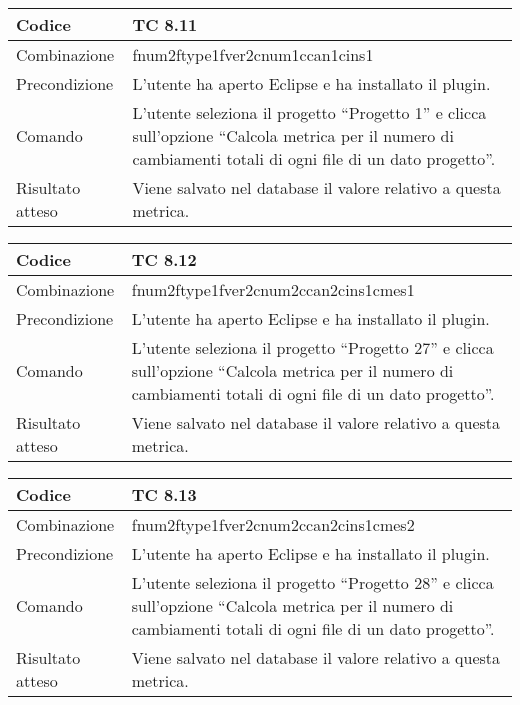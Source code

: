 \begin{table}[ht]
\begin{tabular}{|p{3cm}|p{9cm}|}
\hline
\cellcolor{lightgray}Codice				& TC 8.11								\\
\hline
\cellcolor{lightgray}Combinazione		& fnum2ftype1fver2cnum1ccan1cins1									\\
\hline
\cellcolor{lightgray}Precondizione		& L'utente ha aperto Eclipse e ha installato il plugin.		\\
\hline
\cellcolor{lightgray}Comando			& L'utente seleziona il progetto ``Progetto 1''  e clicca sull'opzione ``Calcola metrica per il numero di cambiamenti totali di ogni file di un dato progetto''.	\\
\hline
\cellcolor{lightgray}Risultato atteso	& Viene salvato nel database il valore relativo a questa metrica.\\
\hline
\end{tabular}
\end{table}

\begin{table}[ht]
\begin{tabular}{|p{3cm}|p{9cm}|}
\hline
\cellcolor{lightgray}Codice				& TC 8.12								\\
\hline
\cellcolor{lightgray}Combinazione		& fnum2ftype1fver2cnum2ccan2cins1cmes1									\\
\hline
\cellcolor{lightgray}Precondizione		& L'utente ha aperto Eclipse e ha installato il plugin.		\\
\hline
\cellcolor{lightgray}Comando			& L'utente seleziona il progetto ``Progetto 27''  e clicca sull'opzione ``Calcola metrica per il numero di cambiamenti totali di ogni file di un dato progetto''.	\\
\hline
\cellcolor{lightgray}Risultato atteso	& Viene salvato nel database il valore relativo a questa metrica.\\
\hline
\end{tabular}
\end{table}

\begin{table}[ht]
\begin{tabular}{|p{3cm}|p{9cm}|}
\hline
\cellcolor{lightgray}Codice				& TC 8.13								\\
\hline
\cellcolor{lightgray}Combinazione		& fnum2ftype1fver2cnum2ccan2cins1cmes2									\\
\hline
\cellcolor{lightgray}Precondizione		& L'utente ha aperto Eclipse e ha installato il plugin.		\\
\hline
\cellcolor{lightgray}Comando			& L'utente seleziona il progetto ``Progetto 28''  e clicca sull'opzione ``Calcola metrica per il numero di cambiamenti totali di ogni file di un dato progetto''.	\\
\hline
\cellcolor{lightgray}Risultato atteso	& Viene salvato nel database il valore relativo a questa metrica.\\
\hline
\end{tabular}
\end{table}

